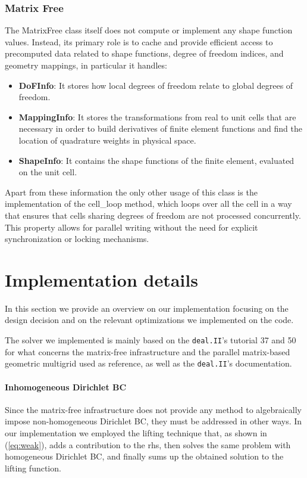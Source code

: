 \documentclass{article}
\begin{document}
\subsubsection{Matrix Free}


The MatrixFree class itself does not compute or implement any shape function values. Instead, its primary role is to cache and provide efficient access to precomputed data related to shape functions, degree of freedom indices, and geometry mappings, in particular it handles:

\begin{itemize}
    \item \textbf{DoFInfo}: It stores how local degrees of freedom relate to global degrees of freedom.
    \item \textbf{MappingInfo}: It stores the transformations from real to unit cells that are necessary in order to build derivatives of finite element functions and find the location of quadrature weights in physical space.
    \item \textbf{ShapeInfo}: It contains the shape functions of the finite element, evaluated on the unit cell.
\end{itemize}

Apart from these information the only other usage of this class is the implementation of the cell\_loop method, which loops over all the cell in a way that ensures that cells sharing degrees of freedom are not processed concurrently. This property allows for parallel writing without the need for explicit synchronization or locking mechanisms.

\section{Implementation details}
In this section we provide an overview on our implementation focusing on the design decision and on the relevant optimizations we implemented on the code.

The solver we implemented is mainly based on the \verb|deal.II|'s tutorial 37 and 50 for what concerns the matrix-free infrastructure and the parallel matrix-based geometric multigrid used as reference, as well as the \verb|deal.II|'s documentation.

\paragraph{Inhomogeneous Dirichlet BC}
Since the matrix-free infrastructure does not provide any method to algebraically impose non-homogeneous Dirichlet BC, they must be addressed in other ways. In our implementation we employed the lifting technique that, as shown in (\ref{eq:weak}), adds a contribution to the rhs, then solves the same problem with homogeneous Dirichlet BC, and finally sums up the obtained solution to the lifting function.
\end{document}

